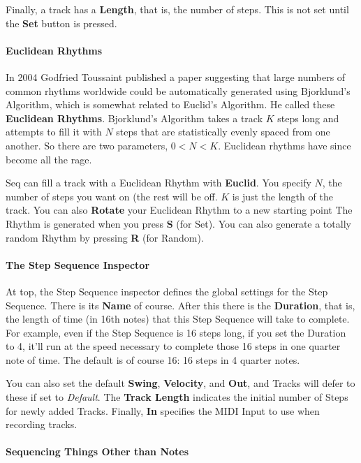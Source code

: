 \documentclass[twoside,10pt]{article}
\begin{document}
Finally, a track has a {\bf Length}, that is, the number of steps.  This is not set until the {\bf Set} button is pressed.

\paragraph{Euclidean Rhythms}

In 2004 Godfried Toussaint published a paper suggesting that large numbers of common rhythms worldwide could be automatically generated using Bjorklund's Algorithm, which is somewhat related to Euclid's Algorithm.  He called these {\bf Euclidean Rhythms}.  Bjorklund's Algorithm takes a track \(K\) steps long and attempts to fill it with \(N\) steps that are statistically evenly spaced from one another.  So there are two parameters, \(0 < N < K\).  Euclidean rhythms have since become all the rage.

Seq can fill a track with a Euclidean Rhythm with {\bf Euclid}.  You specify \(N\), the number of steps you want on (the rest will be off.  \(K\) is just the length of the track.  You can also {\bf Rotate} your Euclidean Rhythm to a new starting point  The Rhythm is generated when you press {\bf S} (for Set).  You can also generate a totally random Rhythm by pressing {\bf R} (for Random).

\paragraph{The Step Sequence Inspector}

At top, the Step Sequence inspector defines the global settings for the Step Sequence.  There is its {\bf Name} of course.  After this there is the {\bf Duration}, that is, the length of time (in 16th notes) that this Step Sequence will take to complete.  For example, even if the Step Sequence is 16 steps long, if you set the Duration to 4, it'll run at the speed necessary to complete those 16 steps in one quarter note of time.  The default is of course 16: 16 steps in 4 quarter notes.

You can also set the default {\bf Swing}, {\bf Velocity}, and {\bf Out}, and Tracks will defer to these if set to {\it Default}.  The {\bf Track Length} indicates the initial number of Steps for newly added Tracks. Finally, {\bf In} specifies the MIDI Input to use when recording tracks.

\paragraph{Sequencing Things Other than Notes}
\end{document}
